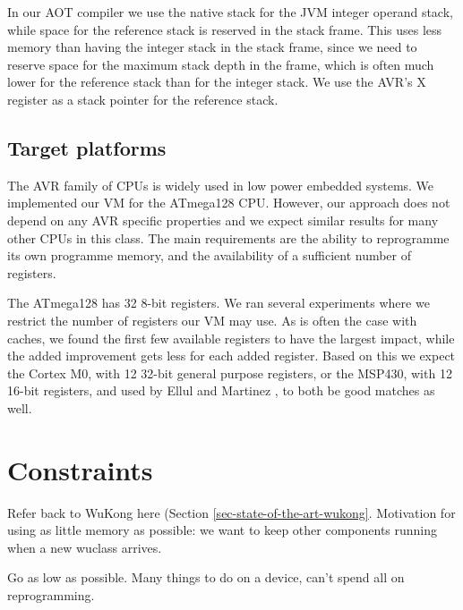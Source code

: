 
In our AOT compiler we use the native stack for the JVM integer operand stack, while space for the reference stack is reserved in the stack frame. This uses less memory than having the integer stack in the stack frame, since we need to reserve space for the maximum stack depth in the frame, which is often much lower for the reference stack than for the integer stack. We use the AVR's X register as a stack pointer for the reference stack.

\subsection{Target platforms}
The AVR family of CPUs is widely used in low power embedded systems. We implemented our VM for the ATmega128 CPU. However, our approach does not depend on any AVR specific properties and we expect similar results for many other CPUs in this class. The main requirements are the ability to reprogramme its own programme memory, and the availability of a sufficient number of registers.

The ATmega128 has 32 8-bit registers. We ran several experiments where we restrict the number of registers our VM may use. As is often the case with caches, we found the first few available registers to have the largest impact, while the added improvement gets less for each added register. Based on this we expect the Cortex M0, with 12 32-bit general purpose registers, or the MSP430, with 12 16-bit registers, and used by Ellul and Martinez \cite{Ellul:2010iw}, to both be good matches as well.


\section{Constraints}

Refer back to WuKong here (Section \ref{sec-state-of-the-art-wukong}. Motivation for using as little memory as possible: we want to keep other components running when a new wuclass arrives.

Go as low as possible. Many things to do on a device, can't spend all on reprogramming.









